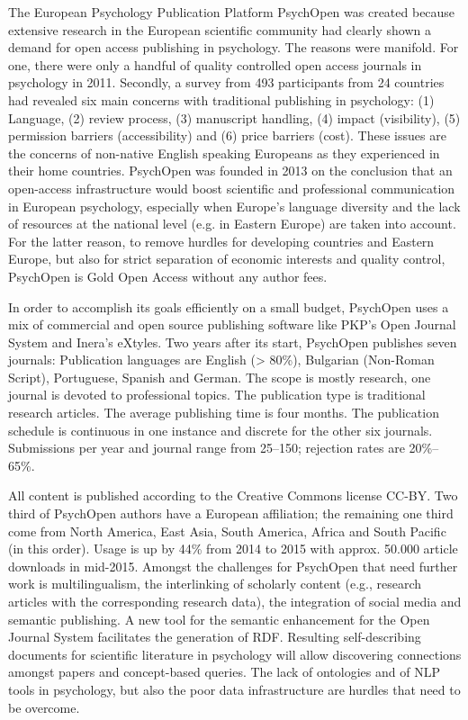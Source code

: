 \documentclass[a4paper,USenglish]{dagrep}
\begin{document}
The European Psychology Publication Platform PsychOpen was created because extensive research in the European scientific community had clearly shown a demand for open access publishing in psychology. The reasons were manifold. For one, there were only a handful of quality controlled open access journals in psychology in 2011. Secondly, a survey from 493 participants from 24 countries had revealed six main concerns with traditional publishing in psychology: (1) Language, (2) review process, (3) manuscript handling, (4) impact (visibility), (5) permission barriers (accessibility) and (6) price barriers (cost). These issues are the concerns of non-native English speaking Europeans as they experienced in their home countries. PsychOpen was founded in 2013 on the conclusion that an open-access infrastructure would boost scientific and professional communication in European psychology, especially when Europe's language diversity and the lack of resources at the national level (e.g. in Eastern Europe) are taken into account. For the latter reason, to remove hurdles for developing countries and Eastern Europe, but also for strict separation of economic interests and quality control, PsychOpen is Gold Open Access without any author fees.

In order to accomplish its goals efficiently on a small budget, PsychOpen uses a mix of commercial and open source publishing software like PKP's Open Journal System and Inera's eXtyles. Two years after its start, PsychOpen publishes seven journals: Publication languages are English (> 80\%), Bulgarian (Non-Roman Script), Portuguese, Spanish and German. The scope is mostly research, one journal is devoted to professional topics. The publication type is traditional research articles. The average publishing time is four months. The publication schedule is continuous in one instance and discrete for the other six journals. Submissions per year and journal range from 25–150; rejection rates are 20\%–65\%.

All content is published according to the Creative Commons license CC-BY. Two third of PsychOpen authors have a European affiliation; the remaining one third come from North America, East Asia, South America, Africa and South Pacific (in this order). Usage is up by 44\% from 2014 to 2015 with approx. 50.000 article downloads in mid-2015. Amongst the challenges for PsychOpen that need further work is multilingualism, the interlinking of scholarly content (e.g., research articles with the corresponding research data), the integration of social media and semantic publishing. A new tool for the semantic enhancement for the Open Journal System facilitates the generation of RDF. Resulting self-describing documents for scientific literature in psychology will allow discovering connections amongst papers and concept-based queries. The lack of ontologies and of NLP tools in psychology, but also the poor data infrastructure are hurdles that need to be overcome.
\end{document}
